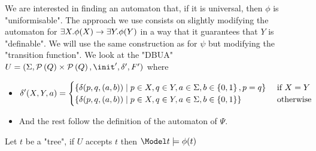 \documentclass{article}
\begin{document}
We are interested in finding an automaton that, if it is universal, then $\phi$ is "uniformisable". The approach we use consists on slightly modifying
the automaton for $\exists X. \phi(X) \rightarrow \exists Y. \phi (Y)$ in a way that it guarantees that $Y$ is "definable". We will use the same construction as for $\psi$ but modifying
the "transition function".
We look at the "DBUA" $U = (\Sigma, \parts Q \times \parts {Q}, \init', \delta', F')$ where
\begin{itemize}
	\item \[
		      \delta'(X,Y,a) = \begin{cases}
			      \left\{\delta(p,q,(a,b)) \mid p \in X, q \in Y, a \in \Sigma, b \in \left\{0,1\right\}, p = q\right\} & \text{ if } X = Y \\
			      \left\{\delta(p,q,(a,b)) \mid p \in X, q \in Y, a \in \Sigma, b \in \left\{0,1\right\} \right\}       & \text{ otherwise} \\
		      \end{cases}
	      \]
	\item And the rest follow the definition of the automaton of $\Psi$.
\end{itemize}

\begin{remark}
	Let $t$ be a "tree", if $U$ accepts $t$ then  $\Model t \models \phi(t)$
\end{remark}








\iffalse
	
	
\fi
\end{document}
